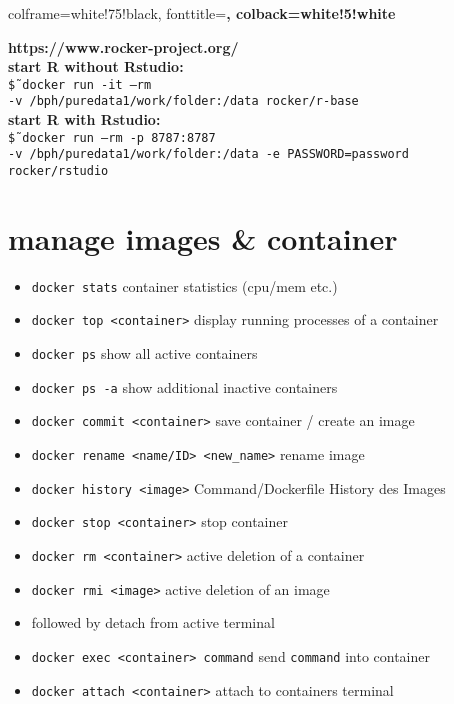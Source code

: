 \documentclass[landscape]{article}
\begin{document}
\begin{multicols*}{3}
\vspace{0.5cm}
%
%
\tcbset
{colframe=white!75!black,
	fonttitle=\bfseries,
	colback=white!5!white
}
%
%

\begin{tcolorbox}[title=Examples]
	\textbf{https://www.rocker-project.org/}\\
	\textbf{start R without Rstudio:}\\
	\texttt{\~\$ docker run -it --rm\\
		-v /bph/puredata1/work/folder:/data
		rocker/r-base }\\
	\textbf{start R with Rstudio:}\\
	\texttt{\~\$ docker run --rm -p 8787:8787\\
	-v /bph/puredata1/work/folder:/data
	-e PASSWORD=password rocker/rstudio}
\end{tcolorbox}


\section*{manage images \& container}
\begin{itemize}
	\item \texttt{docker stats}
	\subitem \textsf{container statistics (cpu/mem etc.)}
	\item \texttt{docker top <container>}
	\subitem \textsf{display running processes of a container}
	\item \texttt{docker ps}
	\subitem \textsf{show all active containers}
	\item \texttt{docker ps -a}
	\subitem \textsf{show additional inactive containers}
	\item \texttt{docker commit <container>}
	\subitem \textsf{save container / create an image}
	\item \texttt{docker rename <name/ID> <new\_name>}
	\subitem \textsf{rename image}
	\item \texttt{docker history <image>}
	\subitem \textsf{Command/Dockerfile History des Images}
	\item \texttt{docker stop <container>}
	\subitem \textsf{stop container}
	\item \texttt{docker rm <container>}
	\subitem \textsf{active deletion of a container}
	\item \texttt{docker rmi <image>}
	\subitem \textsf{active deletion of an image}
	\item \Ctrl {} \textsf{followed by} \Ctrl {}
	\subitem \textsf{detach from active terminal}
	\item \texttt{docker exec <container> command}
	\subitem \textsf{send \texttt{command} into container}
	\item \texttt{docker attach <container>}
	\subitem \textsf{attach to containers terminal}
\end{itemize}


\end{multicols*}
\end{document}
